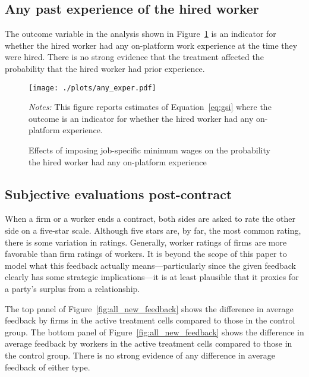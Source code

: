 \documentclass[AER]{AEA}
\begin{document}


\subsection{Any past experience of the hired worker} \label{sec:pastExper} 
The outcome variable in the analysis shown in Figure~\ref{fig:all_new_any_exper} is an indicator for whether the hired worker had any on-platform work experience at the time they were hired. 
There is no strong evidence that the treatment affected the probability that the hired worker had prior experience. 

\begin{figure}[h!]
  \centering
  \caption{Effects of imposing job-specific minimum wages on the probability the hired worker had any on-platform experience} \label{fig:all_new_any_exper}
  \begin{minipage}{1.15\linewidth}
  \texttt{[image: ./plots/any\_exper.pdf]}
  \end{minipage}
  \begin{minipage}{0.95\linewidth}
    {\footnotesize
      \emph{Notes:} This figure reports estimates of Equation~\ref{eq:gsi} where the outcome is an indicator for whether the hired worker had any on-platform experience. 
    }
\end{minipage} 
\end{figure} 

\subsection{Subjective evaluations post-contract} \label{sec:quality} 
When a firm or a worker ends a contract, both sides are asked to rate the other side on a five-star scale. 
Although five stars are, by far, the most common rating, there is some variation in ratings. 
Generally, worker ratings of firms are more favorable than firm ratings of workers. 
It is beyond the scope of this paper to model what this feedback actually means---particularly since the given feedback clearly has some strategic implications---it is at least plausible that it proxies for a party's surplus from a relationship. 

The top panel of Figure~\ref{fig:all_new_feedback} shows the difference in average feedback by firms in the active treatment cells compared to those in the control group.
The bottom panel of Figure~\ref{fig:all_new_feedback} shows the difference in average feedback by workers in the active treatment cells compared to those in the control group.
There is no strong evidence of any difference in average feedback of either type. 
\end{document}
